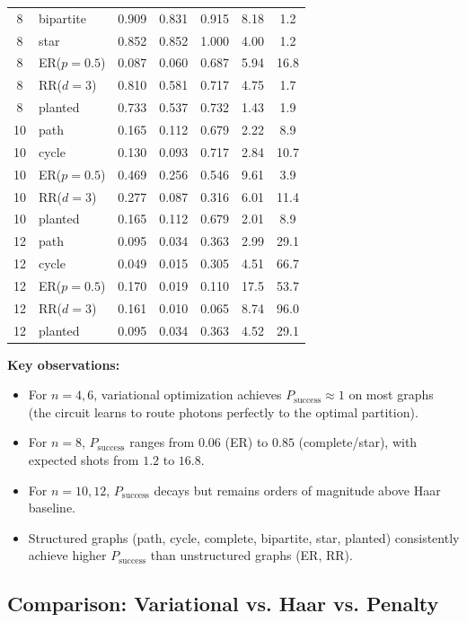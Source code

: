 \begin{table}[ht]
\begin{tabular}{clccccc}
8 & bipartite & 0.909 & 0.831 & 0.915 & 8.18 & 1.2 \\
8 & star & 0.852 & 0.852 & 1.000 & 4.00 & 1.2 \\
8 & ER($p=0.5$) & 0.087 & 0.060 & 0.687 & 5.94 & 16.8 \\
8 & RR($d=3$) & 0.810 & 0.581 & 0.717 & 4.75 & 1.7 \\
8 & planted & 0.733 & 0.537 & 0.732 & 1.43 & 1.9 \\
\midrule
10 & path & 0.165 & 0.112 & 0.679 & 2.22 & 8.9 \\
10 & cycle & 0.130 & 0.093 & 0.717 & 2.84 & 10.7 \\
10 & ER($p=0.5$) & 0.469 & 0.256 & 0.546 & 9.61 & 3.9 \\
10 & RR($d=3$) & 0.277 & 0.087 & 0.316 & 6.01 & 11.4 \\
10 & planted & 0.165 & 0.112 & 0.679 & 2.01 & 8.9 \\
\midrule
12 & path & 0.095 & 0.034 & 0.363 & 2.99 & 29.1 \\
12 & cycle & 0.049 & 0.015 & 0.305 & 4.51 & 66.7 \\
12 & ER($p=0.5$) & 0.170 & 0.019 & 0.110 & 17.5 & 53.7 \\
12 & RR($d=3$) & 0.161 & 0.010 & 0.065 & 8.74 & 96.0 \\
12 & planted & 0.095 & 0.034 & 0.363 & 4.52 & 29.1 \\
\bottomrule
\end{tabular}
\end{table}

\textbf{Key observations:}
\begin{itemize}
\item For $n=4,6$, variational optimization achieves $P_{\mathrm{success}} \approx 1$ on most graphs (the circuit learns to route photons perfectly to the optimal partition).
\item For $n=8$, $P_{\mathrm{success}}$ ranges from $0.06$ (ER) to $0.85$ (complete/star), with expected shots from $1.2$ to $16.8$.
\item For $n=10,12$, $P_{\mathrm{success}}$ decays but remains orders of magnitude above Haar baseline.
\item Structured graphs (path, cycle, complete, bipartite, star, planted) consistently achieve higher $P_{\mathrm{success}}$ than unstructured graphs (ER, RR).
\end{itemize}

\subsection{Comparison: Variational vs. Haar vs. Penalty}

